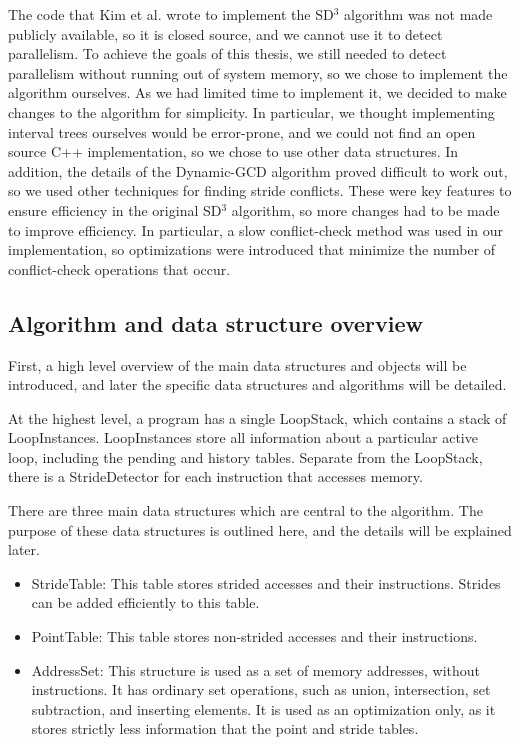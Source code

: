 \documentclass[12pt,twoside]{reedthesis}
\begin{document}
		The code that Kim et al. wrote to implement the SD$^3$ algorithm was not made publicly available, so it is closed source, and we cannot use it to detect parallelism. To achieve the goals of this thesis, we still needed to detect parallelism without running out of system memory, so we chose to implement the algorithm ourselves. As we had limited time to implement it, we decided to make changes to the algorithm for simplicity. In particular, we thought implementing interval trees ourselves would be error-prone, and we could not find an open source C++ implementation, so we chose to use other data structures. 
		In addition, the details of the Dynamic-GCD algorithm proved difficult to work out, so we used other techniques for finding stride conflicts.
		These were key features to ensure efficiency in the original SD$^3$ algorithm, so more changes had to be made to improve efficiency. In particular, a slow conflict-check method was used in our implementation, so optimizations were introduced that minimize the number of conflict-check operations that occur. 
		
		\subsection{Algorithm and data structure overview}
		
			
			First, a high level overview of the main data structures and objects will be introduced, and later the specific data structures and algorithms will be detailed. 
			
			At the highest level, a program has a single LoopStack, which contains a stack of LoopInstances. LoopInstances store all information about a particular active loop, including the pending and history tables.	Separate from the LoopStack, there is a StrideDetector for each instruction that accesses memory. 
			
			There are three main data structures which are central to the algorithm. The purpose of these data structures is outlined here, and the details will be explained later. 
			
			\begin{itemize}
				\item StrideTable: This table stores strided accesses and their instructions. Strides can be added efficiently to this table.
				\item PointTable: This table stores non-strided accesses and their instructions. 
				\item AddressSet: This structure is used as a set of memory addresses, without instructions. It has ordinary set operations, such as union, intersection, set subtraction, and inserting elements. It is used as an optimization only, as it stores strictly less information that the point and stride tables. 
			\end{itemize}
			
\end{document}
